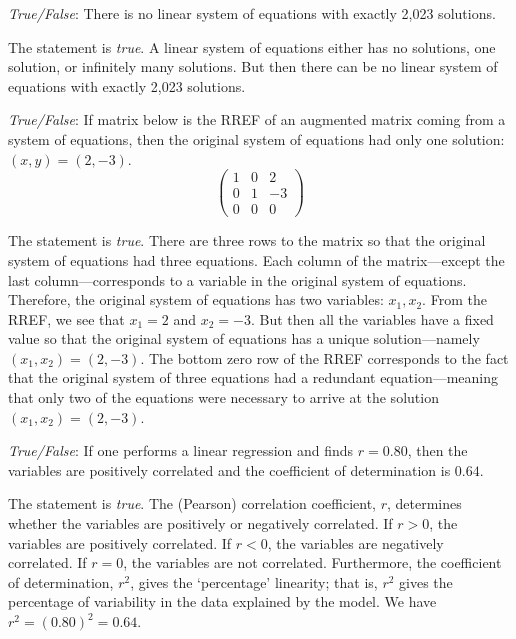 \documentclass[11pt,letterpaper]{article}
\begin{document}
\quizsol \textit{True/False}: There is no linear system of equations with exactly 2,023 solutions. \pspace

\sol The statement is \textit{true}. A linear system of equations either has no solutions, one solution, or infinitely many solutions. But then there can be no linear system of equations with exactly 2,023 solutions. \pvspace{1.3cm}



\quizsol \textit{True/False}: If matrix below is the RREF of an augmented matrix coming from a system of equations, then the original system of equations had only one solution: $(x, y)= (2, -3)$.
	\[
	\begin{pmatrix}
	1 & 0 & 2 \\
	0 & 1 & -3 \\
	0 & 0 & 0 
	\end{pmatrix}
	\] \pspace

\sol The statement is \textit{true}. There are three rows to the matrix so that the original system of equations had three equations. Each column of the matrix---except the last column---corresponds to a variable in the original system of equations. Therefore, the original system of equations has two variables: $x_1, x_2$. From the RREF, we see that $x_1= 2$ and $x_2= -3$. But then all the variables have a fixed value so that the original system of equations has a unique solution---namely $(x_1, x_2)= (2, -3)$. The bottom zero row of the RREF corresponds to the fact that the original system of three equations had a redundant equation---meaning that only two of the equations were necessary to arrive at the solution $(x_1, x_2)= (2, -3)$. \pvspace{1.3cm}



\quizsol \textit{True/False}: If one performs a linear regression and finds $r= 0.80$, then the variables are positively correlated and the coefficient of determination is $0.64$. \pspace

\sol The statement is \textit{true}. The (Pearson) correlation coefficient, $r$, determines whether the variables are positively or negatively correlated. If $r > 0$, the variables are positively correlated. If $r < 0$, the variables are negatively correlated. If $r= 0$, the variables are not correlated. Furthermore, the coefficient of determination, $r^2$, gives the `percentage' linearity; that is, $r^2$ gives the percentage of variability in the data explained by the model. We have $r^2= (0.80)^2= 0.64$. \pvspace{1.3cm}
\end{document}

